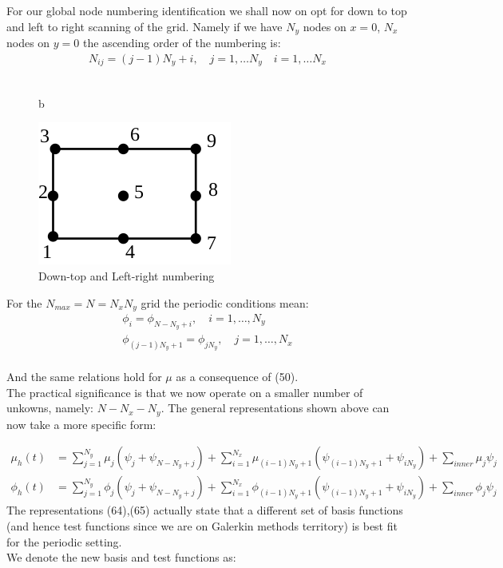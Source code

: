 \documentclass{article}
\begin{document}
For our global node numbering identification we shall now on opt for down to top and left to right scanning of the grid. Namely if we have $N_y$ nodes on ${x=0}$, $N_x$ nodes on ${y=0}$ the ascending order of the numbering is:\\
\begin{align}
N_{ij} = (j-1)N_{y} + i,\quad  j=1,\dots N_y\quad i=1,\dots N_x 
\end{align}\\

\begin{figure}{b}
\begin{center}
\includegraphics[scale=0.6]{numbering.png}
\caption{Down-top and Left-right numbering}\label{Figure3} 
\end{center}
\end{figure}


For the $N_{max} = N = N_{x}N_{y}$ grid the periodic conditions mean:\\
\begin{align}
\phi_{i} = \phi_{N-N_{y}+i},\quad i =1,\dots,N_y\\
\phi_{(j-1)N_y+1} = \phi_{jN_{y}},\quad j =1,\dots,N_x
\end{align}\\
And the same relations hold for $\mu$ as a consequence of (50).\\

The practical significance is that we now operate on a smaller number of unkowns, namely: $ N-N_x-N_y$. The general representations shown above can now take a more specific form:

\begin{align}
\mu_h(t) &=  \sum_{j=1}^{N_y}\mu_{j}(\psi_{j}+\psi_{N-N_y+j}) + \sum_{i=1}^{N_x}\mu_{(i-1)N_y+1}(\psi_{(i-1)N_y+1}+\psi_{iN_y})+\sum_{inner}\mu_{j}\psi_{j}\\
\phi_h(t) &=  \sum_{j=1}^{N_y}\phi_{j}(\psi_{j}+\psi_{N-N_y+j}) + \sum_{i=1}^{N_x}\phi_{(i-1)N_y+1}(\psi_{(i-1)N_y+1}+\psi_{iN_y})+\sum_{inner}\phi_{j}\psi_{j}
\end{align}
The representations (64),(65) actually state that a different set of basis functions (and hence test functions since we are on Galerkin methods territory) is best fit for the periodic setting.\\
We denote the new basis and test functions as:\\
\end{document}
